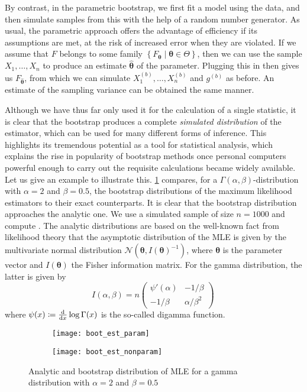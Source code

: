 \documentclass[a4paper]{book}
\begin{document}
By contrast, in the parametric bootstrap, we first fit a model using the data, and then simulate samples from this with the help of a random number generator. As usual, the parametric approach offers the advantage of efficiency if its assumptions are met, at the risk of increased error when they are violated. If we assume that $F$ belongs to some family $\left \{ F_{\bm{\theta}} \mid  \bm{\theta} \in \Theta \right \}$, then we can use the sample $X_1, \dots, X_n$ to produce an estimate $\bm{\widehat{\theta}}$ of the parameter. Plugging this in then gives us $F_{\bm{\widehat{\theta}}}$, from which we can simulate $X^{(b)}_1, \dots , X^{(b)}_n$ and $g^{(b)}$ as before. An estimate of the sampling variance can be obtained the same manner.

Although we have thus far only used it for the calculation of a single statistic, it is clear that the bootstrap produces a complete \emph{simulated distribution} of the estimator, which can be used for many different forms of inference. This highlights its tremendous potential as a tool for statistical analysis, which explains the rise in popularity of bootstrap methods once personal computers powerful enough to carry out the requisite calculations became widely available. Let us give an example to illustrate this. \cref{fig:boot-est} compares, for a $\Gamma(\alpha, \beta)$-distribution with $\alpha = 2$ and $\beta = 0.5$, the bootstrap distributions of the maximum likelihood estimators to their exact counterparts. It is clear that the bootstrap distribution approaches the analytic one. We use a simulated sample of size $n = 1000$ and compute . The analytic distributions are based on the well-known fact from likelihood theory that the asymptotic distribution of the MLE is given by the multivariate normal distribution $\mathcal{N}(\bm{\theta}, I(\bm{\theta})^{-1})$, where $\bm{\theta}$ is the parameter vector and $I(\bm{\theta})$ the Fisher information matrix. For the gamma distribution, the latter is given by
\begin{equation}
  I(\alpha, \beta) = n
  \begin{pmatrix}
    \psi'(\alpha) & -1 / \beta       \\
    -1 / \beta    & \alpha / \beta^2
  \end{pmatrix} \,
\end{equation}
where $\psi(x) \coloneqq \odv{}{x} \log \Gamma(x)$ is the so-called digamma function.

\begin{landscape}
  \begin{figure}
    \begin{subfigure}{\linewidth}
      \texttt{[image: boot\_est\_param]}
    \end{subfigure}
    \begin{subfigure}{\linewidth}
      \texttt{[image: boot\_est\_nonparam]}
    \end{subfigure}
    \caption{Analytic and bootstrap distribution of MLE for a gamma distribution with $\alpha = 2$ and $\beta = 0.5$}
    \label{fig:boot-est}
  \end{figure}
\end{landscape}
\end{document}
